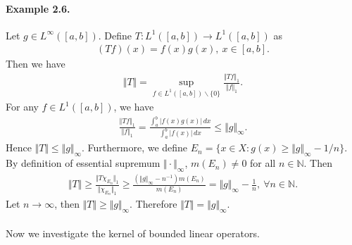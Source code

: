 \documentclass{article}
\begin{document}
\paragraph{Example 2.6.\label{example:2.6}} Let $g\in L^\infty([a,b])$. Define $T:L^1([a,b])\to L^1([a,b])$ as
\begin{align*}
	(Tf)(x) = f(x)g(x),\ x\in[a,b].
\end{align*}
Then we have
\begin{align*}
	\Vert T\Vert = \sup_{f\in L^1([a,b])\backslash\{0\}}\frac{\Vert Tf\Vert_1}{\Vert f\Vert_1}.
\end{align*}
For any $f\in L^1([a,b])$, we have
\begin{align*}
	\frac{\Vert Tf\Vert_1}{\Vert f\Vert_1} = \frac{\int_a^b \vert f(x)g(x)\vert\,dx}{\int_a^b\vert f(x)\vert\,dx} \leq \Vert g\Vert_\infty.
\end{align*}
Hence $\Vert T\Vert \leq \Vert g\Vert_\infty$. Furthermore, we define $E_n=\{x\in X: g(x)\geq \Vert g\Vert_\infty - 1/n\}$. By definition of essential supremum $\Vert\cdot\Vert_\infty$, $m(E_n)\neq 0$ for all $n\in\mathbb{N}$. Then
\begin{align*}
	\Vert T\Vert \geq \frac{\Vert T\chi_{E_n}\Vert_1}{\Vert\chi_{E_n}\Vert_1} \geq \frac{(\Vert g\Vert_\infty -n^{-1})m(E_n)}{m(E_n)} = \Vert g\Vert_\infty - \frac{1}{n},\ \forall n\in\mathbb{N}.
\end{align*}
Let $n\to\infty$, then $\Vert T\Vert \geq \Vert g\Vert_\infty$. Therefore $\Vert T\Vert = \Vert g\Vert_\infty$.

\paragraph{} Now we investigate the kernel of bounded linear operators.
\end{document}
